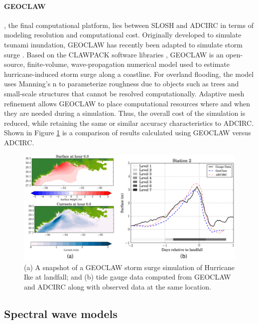 \paragraph{GEOCLAW} , the final computational platform, lies between SLOSH and ADCIRC in terms of modeling resolution and computational cost. Originally developed to simulate tsunami inundation, GEOCLAW has recently been adapted to simulate storm surge \citep{berger2011geoclaw, Mandli et al. 2014}. Based on the CLAWPACK software libraries \citep{leveque2002finite}, GEOCLAW is an open-source, finite-volume, wave-propagation numerical model used to estimate hurricane-induced storm surge along a coastline. For overland flooding, the model uses Manning's n to parameterize roughness due to objects such as trees and small-scale structures that cannot be resolved computationally. Adaptive mesh refinement allows GEOCLAW to place computational resources where and when they are needed during a simulation. Thus, the overall cost of the simulation is reduced, while retaining the same or similar accuracy characteristics to ADCIRC. Shown in Figure \ref{fig:GEOCLAW_ADCIRC_comparison} is a comparison of results calculated using GEOCLAW versus ADCIRC. 

\begin{figure}[htb]
    \centering
    \includegraphics[width=1.0\textwidth, angle = 0]{Figures/GEOCLAW_ADCIRC_comparison.png}
    \caption{(a) A snapshot of a GEOCLAW storm surge simulation of Hurricane Ike at landfall; and (b) tide gauge data computed from GEOCLAW and ADCIRC along with observed data at the same location. \citep{mandli2016clawpack}}
    \label{fig:GEOCLAW_ADCIRC_comparison}
\end{figure}

\subsection{Spectral wave models}

